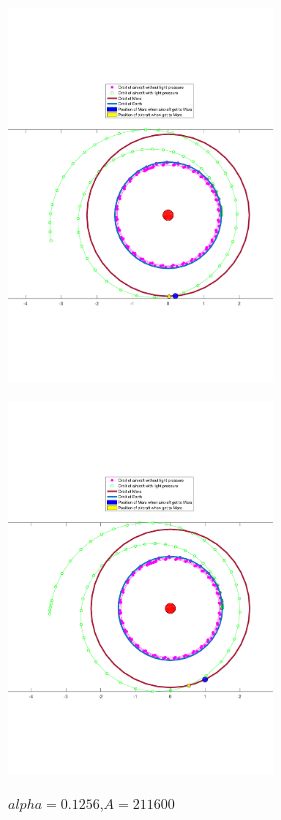\documentclass[../Paper.tex]{subfiles}
\begin{document}
\begin{figure}[H]
 \begin{minipage}[t]{0.5\linewidth}
 \centering{}
 \includegraphics[width=7cm]{../Figures/orbit4.pdf}
 \label{fig:orbit4}
\caption{$alpha=0.1099$,$A=211600$}
 \end{minipage}
 \begin{minipage}[t]{0.5\linewidth}
 \centering{}
 \includegraphics[width=7cm]{../Figures/orbit5.pdf}
 \label{fig:orbit5}
\caption{$alpha=0.1256$,$A=211600$}
 \end{minipage}
\end{figure}
\end{document}
